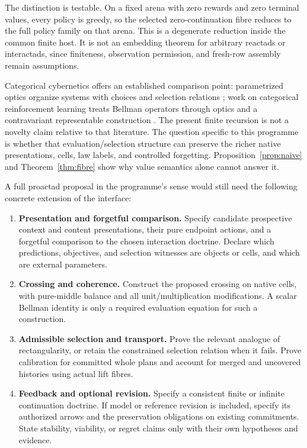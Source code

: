 \documentclass[11pt]{article}
\theoremstyle{definition}
\begin{document}
The distinction is testable. On a fixed arena with zero rewards and zero
terminal values, every policy is greedy, so the selected zero-continuation
fibre reduces to the full policy family on that arena. This is a degenerate reduction
inside the common finite host. It is not an embedding theorem for arbitrary
reactads or interactads, since finiteness, observation permission, and
fresh-row assembly remain assumptions.

Categorical cybernetics offers an established comparison point:
parametrized optics organize systems with choices and selection relations
\cite{cybernetics}; work on categorical reinforcement learning treats
Bellman operators through optics and a contravariant representable
construction \cite{rl}. The present finite recursion is not a novelty
claim relative to that literature. The question specific to this programme
is whether that evaluation/selection structure can preserve the richer
native presentations, cells, law labels, and controlled forgetting.
Proposition~\ref{prop:naive} and Theorem~\ref{thm:fibre} show why value
semantics alone cannot answer it.

A full proactad proposal in the programme's sense would still need the
following concrete extension of the interface:
\begin{enumerate}[label=(\roman*)]
\item \textbf{Presentation and forgetful comparison.}
Specify candidate prospective context and content presentations, their
pure endpoint actions, and a forgetful comparison to the chosen interaction
doctrine. Declare which predictions, objectives, and selection witnesses
are objects or cells, and which are external parameters.
\item \textbf{Crossing and coherence.}
Construct the proposed crossing on native cells, with pure-middle balance
and all unit/multiplication modifications. A scalar Bellman identity is
only a required evaluation equation for such a construction.
\item \textbf{Admissible selection and transport.}
Prove the relevant analogue of rectangularity, or retain the constrained
selection relation when it fails. Prove calibration for committed whole
plans and account for merged and uncovered histories using actual lift
fibres.
\item \textbf{Feedback and optional revision.}
Specify a consistent finite or infinite continuation doctrine. If model
or reference revision is included, specify its authorized arrows and the
preservation obligations on existing commitments. State stability, viability, or regret
claims only with their own hypotheses and evidence.
\end{enumerate}
\end{document}
